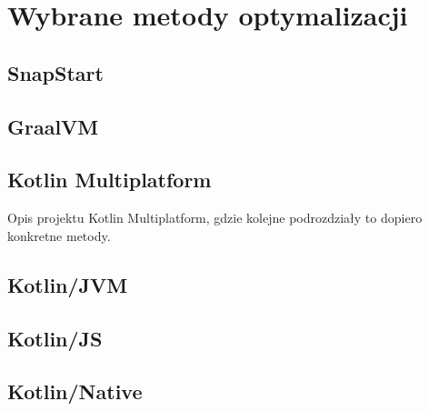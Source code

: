\chapter{Wybrane metody optymalizacji}\label{chapter:wybrane_metody_optimalizacji}

\section{SnapStart}\label{chapter:snapstart}
\section{GraalVM}\label{chapter:graalvm}
\section{Kotlin Multiplatform}\label{chapter:kotlin_multiplatform}
Opis projektu Kotlin Multiplatform, gdzie kolejne podrozdziały to dopiero konkretne metody.
\section{Kotlin/JVM}\label{chapter:kotlin_jvm}
\section{Kotlin/JS}\label{chapter:kotlin_js}
\section{Kotlin/Native}\label{chapter:kotlin_native}
